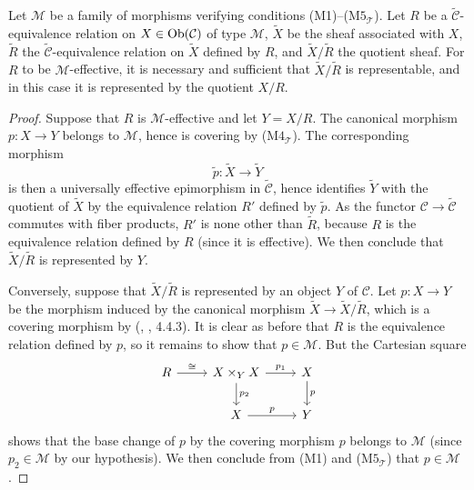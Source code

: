 \begin{proposition}\label{site sheaf M-effective relation iff quotient representable}
Let $\mathcal{M}$ be a family of morphisms verifying conditions (M1)--($\text{M5}_\mathcal{T}$). Let $R$ be a $\widetilde{\mathcal{C}}$-equivalence relation on $X\in\mathrm{Ob}(\mathcal{C})$ of type $\mathcal{M}$, $\widetilde{X}$ be the sheaf associated with $X$, $\widetilde{R}$ the $\widetilde{\mathcal{C}}$-equivalence relation on $\widetilde{X}$ defined by $R$, and $\widetilde{X}/\widetilde{R}$ the quotient sheaf. For $R$ to be $\mathcal{M}$-effective, it is necessary and sufficient that $\widetilde{X}/\widetilde{R}$ is representable, and in this case it is represented by the quotient $X/R$.
\end{proposition}
\begin{proof}
Suppose that $R$ is $\mathcal{M}$-effective and let $Y=X/R$. The canonical morphism $p:X\to Y$ belongs to $\mathcal{M}$, hence is covering by ($\text{M4}_\mathcal{T}$). The corresponding morphism
\[\tilde{p}:\widetilde{X}\to\widetilde{Y}\]
is then a universally effective epimorphism in $\widetilde{\mathcal{C}}$, hence identifies $\widetilde{Y}$ with the quotient of $\widetilde{X}$ by the equivalence relation $R'$ defined by $\tilde{p}$. As the functor $\mathcal{C}\to\widetilde{\mathcal{C}}$ commutes with fiber products, $R'$ is none other than $\widetilde{R}$, because $R$ is the equivalence relation defined by $R$ (since it is effective). We then conclude that $\widetilde{X}/\widetilde{R}$ is represented by $Y$.\par
Conversely, suppose that $\widetilde{X}/\widetilde{R}$ is represented by an object $Y$ of $\mathcal{C}$. Let $p:X\to Y$ be the morphism induced by the canonical morphism $\widetilde{X}\to\widetilde{X}/\widetilde{R}$, which is a covering morphism by (\cite{SGA3}, , 4.4.3). It is clear as before that $R$ is the equivalence relation defined by $p$, so it remains to show that $p\in\mathcal{M}$. But the Cartesian square
\[\begin{tikzcd}
R\ar[r,"\cong"]&X\times_YX\ar[d,"p_2"]\ar[r,"p_1"]&X\ar[d,"p"]\\
&X\ar[r,"p"]&Y
\end{tikzcd}\]
shows that the base change of $p$ by the covering morphism $p$ belongs to $\mathcal{M}$ (since $p_2\in\mathcal{M}$ by our hypothesis). We then conclude from (M1) and ($\text{M5}_\mathcal{T}$) that $p\in\mathcal{M}$.
\end{proof}

